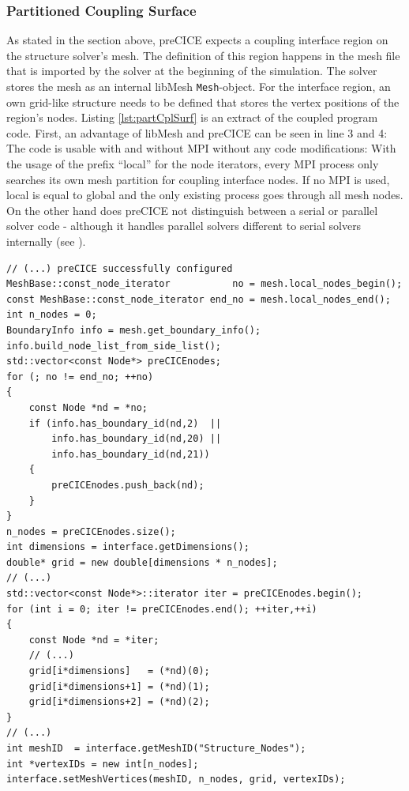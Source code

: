   \subsubsection{Partitioned Coupling Surface}\label{sec:Coupl-Impl-PartCplSurf}
   As stated in the section above, preCICE expects a coupling interface region on the structure solver's mesh. The definition of this region happens in the mesh file that is imported by the solver at the beginning of the simulation. The solver stores the mesh as an internal libMesh \texttt{Mesh}-object. For the interface region, an own grid-like structure needs to be defined that stores the vertex positions of the region's nodes. Listing \ref{lst:partCplSurf} is an extract of the coupled program code. First, an advantage of libMesh and preCICE can be seen in line 3 and 4: The code is usable with and without MPI without any code modifications: With the usage of the prefix ``local'' for the node iterators, every MPI process only searches its own mesh partition for coupling interface nodes. If no MPI is used, local is equal to global and the only existing process goes through all mesh nodes. On the other hand does preCICE not distinguish between a serial or parallel solver code - although it handles parallel solvers different to serial solvers internally (see \cite{gatzhammer2015efficient}).
   
\begin{lstlisting}[caption=Partition Coupling Surface,label=lst:partCplSurf,keepspaces=true]
// (...) preCICE successfully configured
MeshBase::const_node_iterator           no = mesh.local_nodes_begin();
const MeshBase::const_node_iterator end_no = mesh.local_nodes_end();
int n_nodes = 0;
BoundaryInfo info = mesh.get_boundary_info();
info.build_node_list_from_side_list();
std::vector<const Node*> preCICEnodes;
for (; no != end_no; ++no)
{
	const Node *nd = *no;
   	if (info.has_boundary_id(nd,2)  ||
	    info.has_boundary_id(nd,20) ||
	    info.has_boundary_id(nd,21))
   	{
	   	preCICEnodes.push_back(nd);
   	}
}
n_nodes = preCICEnodes.size();
int dimensions = interface.getDimensions();
double* grid = new double[dimensions * n_nodes];
// (...)
std::vector<const Node*>::iterator iter = preCICEnodes.begin();
for (int i = 0; iter != preCICEnodes.end(); ++iter,++i)
{
	const Node *nd = *iter;
	// (...)
	grid[i*dimensions]   = (*nd)(0);
	grid[i*dimensions+1] = (*nd)(1);
	grid[i*dimensions+2] = (*nd)(2);
}
// (...)
int meshID  = interface.getMeshID("Structure_Nodes");
int *vertexIDs = new int[n_nodes];
interface.setMeshVertices(meshID, n_nodes, grid, vertexIDs);
\end{lstlisting}

